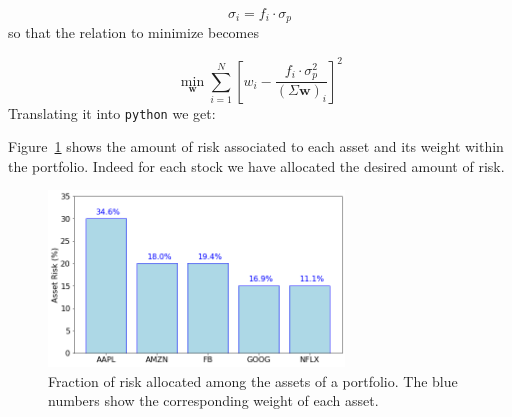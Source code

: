 \begin{equation} 
\sigma _{i}=f_i \cdot \sigma_p 
\end{equation}
so that the relation to minimize becomes

\begin{equation} 
\underset{\mathbf{w}}{\min} \sum _{i=1}^{N}\left[w_{i}-{\frac {f_i \cdot \sigma_p^{2}}{(\Sigma \mathbf{w})_{i}}}\right]^{2} 
\end{equation}
\noindent
Translating it into \texttt{python} we get:


Figure~\ref{fig:risk_allocation} shows the amount of risk associated to each asset and its weight within the portfolio. 
Indeed for each stock we have allocated the desired amount of risk.

\begin{figure}[htb]
\centering
\includegraphics[width=0.7\textwidth]{figures/risk_allocation}
\caption{Fraction of risk allocated among the assets of a portfolio. The blue numbers show the corresponding weight of each asset.}
\label{fig:risk_allocation}
\end{figure}

